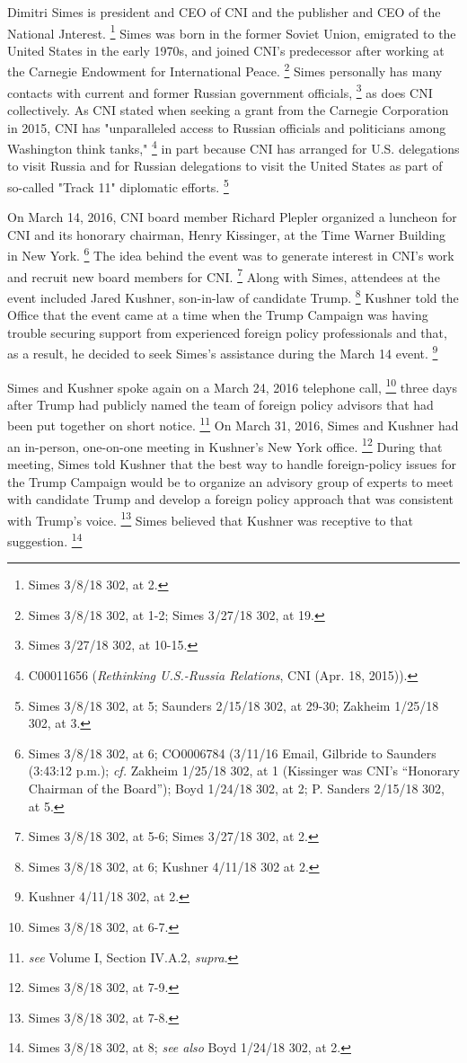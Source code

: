 Dimitri Simes is president and CEO of CNI and the publisher and CEO of the National Jnterest.%
\footnote{Simes 3/8/18 302, at 2.}
Simes was born in the former Soviet Union, emigrated to the United States in the early 1970s, and joined CNI's predecessor after working at the Carnegie Endowment for International Peace.%
\footnote{ Simes 3/8/18 302, at 1-2;
Simes 3/27/18 302, at 19.}
Simes personally has many contacts with current and former Russian government officials,%
\footnote{Simes 3/27/18 302, at 10-15.}
as does CNI collectively.
As CNI stated when seeking a grant from the Carnegie Corporation in 2015, CNI has "unparalleled access to Russian officials and politicians among Washington think tanks,"%
\footnote{C00011656 (\textit{Rethinking U.S.-Russia Relations}, CNI (Apr. 18, 2015)).}
in part because CNI has arranged for U.S. delegations to visit Russia and for Russian delegations to visit the United States as part of so-called "Track 11" diplomatic efforts.%
\footnote{Simes 3/8/18 302, at 5;
Saunders 2/15/18 302, at 29-30;
Zakheim 1/25/18 302, at 3.}

On March 14, 2016, CNI board member Richard Plepler organized a luncheon for CNI and its honorary chairman, Henry Kissinger, at the Time Warner Building in New York.%
\footnote{Simes 3/8/18 302, at 6;
CO0006784 (3/11/16 Email, Gilbride to Saunders (3:43:12 p.m.);
\textit{cf.} Zakheim 1/25/18 302, at 1 (Kissinger was CNI’s “Honorary Chairman of the Board”);
Boyd 1/24/18 302, at 2;
P. Sanders 2/15/18 302, at 5.}
The idea behind the event was to generate interest in CNI's work and recruit new board members for CNI.%
\footnote{Simes 3/8/18 302, at 5-6; Simes 3/27/18 302, at 2.}
Along with Simes, attendees at the event included Jared Kushner, son-in-law of candidate Trump.%
\footnote{Simes 3/8/18 302, at 6; Kushner 4/11/18 302 at 2.}
Kushner told the Office that the event came at a time when the Trump Campaign was having trouble securing support from experienced foreign policy professionals and that, as a result, he decided to seek Simes's assistance during the March 14 event.%
\footnote{Kushner 4/11/18 302, at 2.}

Simes and Kushner spoke again on a March 24, 2016 telephone call,%
\footnote{Simes 3/8/18 302, at 6-7.}
three days after Trump had publicly named the team of foreign policy advisors that had been put together on short notice.%
\footnote{ \textit{see} Volume I, Section IV.A.2, \textit{supra}.}
On March 31, 2016, Simes and Kushner had an in-person, one-on-one meeting in Kushner's New York office.%
\footnote{Simes 3/8/18 302, at 7-9.}
During that meeting, Simes told Kushner that the best way to handle foreign-policy issues for the Trump Campaign would be to organize an advisory group of experts to meet with candidate Trump and develop a foreign policy approach that was consistent with Trump's voice.%
\footnote{Simes 3/8/18 302, at 7-8.}
Simes believed that Kushner was receptive to that suggestion.%
\footnote{Simes 3/8/18 302, at 8;
\textit{see also} Boyd 1/24/18 302, at 2.}

